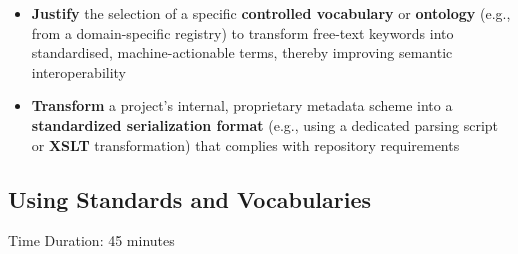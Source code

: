 \documentclass[11pt]{tibop-article}
\begin{document}
\begin{itemize}
    \item \textbf{Justify} the selection of a specific \textbf{controlled vocabulary} or \textbf{ontology} (e.g., from a domain-specific registry) to transform free-text keywords into standardised, machine-actionable terms, thereby improving semantic interoperability
        \item \textbf{Transform} a project's internal, proprietary metadata scheme into a \textbf{standardized serialization format} (e.g., using a dedicated parsing script or \textbf{XSLT} transformation) that complies with repository requirements
\end{itemize}

\subsection{Using Standards and Vocabularies}
Time Duration: 45 minutes
\end{document}

